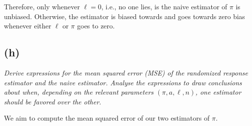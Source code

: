 \documentclass{article}
\begin{document}
Therefore, only whenever $\ell = 0$, i.e., no one lies, is the naive estimator of $\pi$ is unbiased.
Otherwise, the estimator is biased towards and goes towards zero bias whenever either $\ell$ or $\pi$ goes to zero.


\subsection*{(h)}
\textit{Derive expressions for the mean squared error (MSE) of the randomized response estimator and the naive estimator. Analyse the expressions to draw conclusions about when, depending on the relevant parameters $(\pi, a, \ell, n)$, one estimator should be favored over the other.}

We aim to compute the mean squared error of our two estimators of $\pi$.
\end{document}
